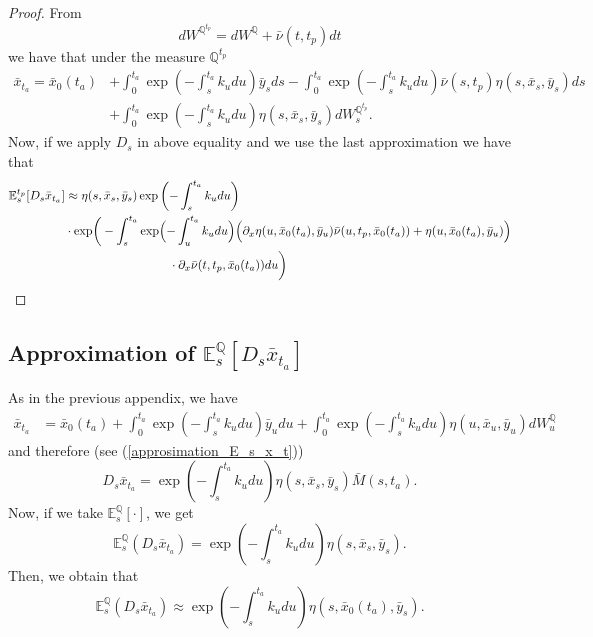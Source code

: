 \documentclass[a4paper,10pt]{article}
\newcommand{\1}{\mathbf{1}}
\begin{document}
\begin{proof}
From 
\begin{equation*}
dW^{\mathbb{Q}^{t_p}} = dW^{\mathbb{Q}} + \bar{\nu}(t,t_p) dt
\end{equation*}
we have that under the measure $\mathbb{Q}^{t_p}$ 
\begin{align*}
\bar{x}_{t_a} = \bar{x}_0(t_a) &+ \int_{0}^{t_a} \exp\left(-\int_{s}^{t_a}k_u du\right) \bar{y}_s ds - \int_{0}^{t_a} \exp\left(-\int_{s}^{t_a}k_u du\right) \bar{\nu}(s, t_p) \eta(s,\bar{x}_s,\bar{y}_s) ds   \\
&+ \int_{0}^{t_a}  \exp\left(-\int_{s}^{t_a}k_u du \right)\eta(s,\bar{x}_s,\bar{y}_s) dW_s^{\mathbb{Q}^{t_p}}. 
\end{align*}
Now, if we apply $D_s$ in above equality and we use the last approximation we have that
\begin{align*}
\mathbb{E}^{t_p}_s[D_s \bar{x}_{t_a}] &\approx \eta(s,\bar{x}_s,\bar{y}_s) \exp\left(-\int_{s}^{t_a}k_u du \right)\\ &\cdot \exp\biggr(-\int_{s}^{t_a} \exp\Bigl(-\int_{u}^{t_a}k_u du\Bigr) \Bigl(\partial_x \eta(u, \bar{x}_0(t_a), \bar{y}_{u}) \bar{\nu}(u,t_p, \bar{x}_0(t_a)) + \eta(u,\bar{x}_0(t_a), \bar{y}_{u})\Bigr) \\
\qquad &\hspace{3cm} \cdot \partial_x \bar{\nu} (t,t_p, \bar{x}_0(t_a)) du\biggr)
\end{align*}
\end{proof}

\subsection{Approximation of $\mathbb{E}_s^{\mathbb{Q}}\left[D_s \bar{x}_{t_a}\right]$}
As in the previous appendix, we have
\begin{align*}
\bar{x}_{t_a} &= \bar{x}_0(t_a) + \int_{0}^{t_a} \exp\left(-\int_{s}^{t_a}k_u du\right) \bar{y}_u du + \int_{0}^{t_a} \exp\left(-\int_{s}^{t_a}k_u du \right) \eta(u,\bar{x}_u,\bar{y}_u) dW_u^{\mathbb{Q}}
\end{align*}
and therefore (see (\ref{approsimation_E_s_x_t}))
\begin{equation}
D_s \bar{x}_{t_a} =  \exp\left(-\int_{s}^{t_a}k_u du \right) \eta(s,\bar{x}_s,\bar{y}_{s})\bar{M}(s,t_a).
\end{equation}
Now, if we take $\mathbb{E}_s^{\mathbb{Q}}\left[\cdot\right]$, we get
\begin{equation}\label{approximation_spot_E_s_x_t}
\mathbb{E}^{\mathbb{Q}}_s\left(D_s \bar{x}_{t_a} \right)=\exp\left(-\int_{s}^{t_a}k_u du \right) \eta(s,\bar{x}_s,\bar{y}_{s}).
\end{equation}
Then, we obtain that
\begin{equation}\label{approximation_spot_E_s_x_t}
\mathbb{E}^{\mathbb{Q}}_s\left(D_s \bar{x}_{t_a} \right) \approx \exp\left(-\int_{s}^{t_a}k_u du \right) \eta(s,\bar{x}_0(t_a),\bar{y}_{s}).
\end{equation}
\end{document}
